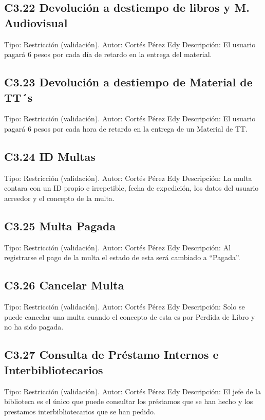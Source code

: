 \subsection{C3.22 Devolución a destiempo de libros y M. Audiovisual}
	\UCli Tipo: Restricción (validación).
	\UCli Autor: Cortés Pérez Edy
	\UCli Descripción: El usuario pagará 6 pesos por cada día de retardo en la entrega del material.
	
\subsection{C3.23 Devolución a destiempo de Material de TT´s}
	\UCli Tipo: Restricción (validación).
	\UCli Autor: Cortés Pérez Edy
	\UCli Descripción: El usuario pagará 6 pesos por cada hora de retardo en la entrega de un Material de TT.
	
\subsection{C3.24 ID Multas}
	\UCli Tipo: Restricción (validación).
	\UCli Autor: Cortés Pérez Edy
	\UCli Descripción: La multa contara con un ID propio e irrepetible, fecha de expedición, los datos del usuario acreedor y el concepto de la multa.
	
\subsection{C3.25 Multa Pagada}
	\UCli Tipo: Restricción (validación).
	\UCli Autor: Cortés Pérez Edy
	\UCli Descripción: Al registrarse el pago de la multa el estado de esta será cambiado a “Pagada”.
	
\subsection{C3.26 Cancelar Multa}
	\UCli Tipo: Restricción (validación).
	\UCli Autor: Cortés Pérez Edy
	\UCli Descripción: Solo se puede cancelar una multa cuando el concepto de esta es por Perdida de Libro y no ha sido pagada.
	
\subsection{C3.27 Consulta de Préstamo Internos e Interbibliotecarios}
	\UCli Tipo: Restricción (validación).
	\UCli Autor: Cortés Pérez Edy
	\UCli Descripción: El jefe de la biblioteca es el único que puede consultar los préstamos que se han hecho y los prestamos interbibliotecarios que se han pedido.
	
